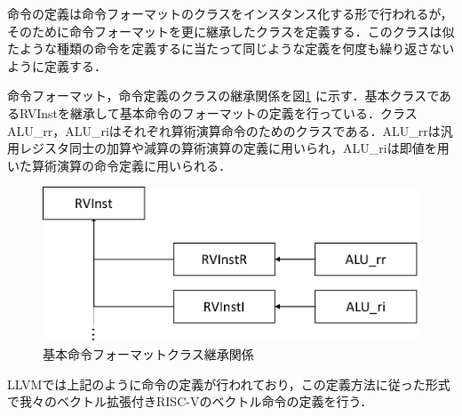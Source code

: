 命令の定義は命令フォーマットのクラスをインスタンス化する形で行われるが，そのために命令フォーマットを更に継承したクラスを定義する．このクラスは似たような種類の命令を定義するに当たって同じような定義を何度も繰り返さないように定義する．

命令フォーマット，命令定義のクラスの継承関係を図\ref{fig:InstFromat_class}
に示す．基本クラスであるRVInstを継承して基本命令のフォーマットの定義を行っている．クラスALU\_rr，ALU\_riはそれぞれ算術演算命令のためのクラスである．ALU\_rrは汎用レジスタ同士の加算や減算の算術演算の定義に用いられ，ALU\_riは即値を用いた算術演算の命令定義に用いられる．

\begin{figure}[tb]
    \centering
    \includegraphics[scale=0.5]{image/InstFormat_class.pdf}
    \caption{基本命令フォーマットクラス継承関係}
    \label{fig:InstFromat_class}
\end{figure}

LLVMでは上記のように命令の定義が行われており，この定義方法に従った形式で我々のベクトル拡張付きRISC-Vのベクトル命令の定義を行う．